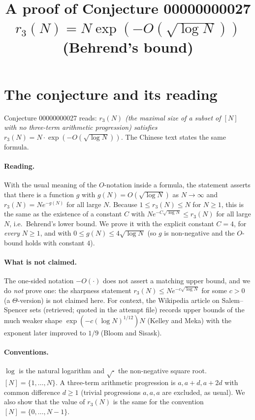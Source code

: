 \documentclass[11pt]{article}
\title{A proof of Conjecture 00000000027\\[2pt]
\large $r_3(N) = N\exp(-O(\sqrt{\log N}))$ (Behrend's bound)}
\date{}
\theoremstyle{definition}
\theoremstyle{remark}
\renewcommand{\_}{\oldus\allowbreak}
\begin{document}
\sloppy
\maketitle

\section{The conjecture and its reading}

Conjecture 00000000027 reads: \emph{$r_3(N)$ (the maximal size of a subset of $[N]$ with no
three-term arithmetic progression) satisfies $r_3(N) = N\cdot\exp(-O(\sqrt{\log N}))$.} The Chinese
text states the same formula.

\paragraph{Reading.} With the usual meaning of the $O$-notation inside a formula, the statement asserts
that there is a function $g$ with $g(N) = O(\sqrt{\log N})$ as $N\to\infty$ and
$r_3(N) = N e^{-g(N)}$ for all large $N$. Because $1 \le r_3(N) \le N$ for $N \ge 1$, this is the same as
the existence of a constant $C$ with $N e^{-C\sqrt{\log N}} \le r_3(N)$ for all large $N$, i.e.\ Behrend's
lower bound. We prove it with the explicit constant $C = 4$, for \emph{every} $N\ge 1$, and with
$0 \le g(N) \le 4\sqrt{\log N}$ (so $g$ is non-negative and the $O$-bound holds with constant $4$).

\paragraph{What is not claimed.} The one-sided notation $-O(\cdot)$ does not assert a matching upper
bound, and we do \emph{not} prove one: the sharpness statement $r_3(N) \le N e^{-c\sqrt{\log N}}$ for some
$c>0$ (a $\Theta$-version) is not claimed here. For context, the Wikipedia article on Salem--Spencer sets
(retrieved; quoted in the attempt file) records upper bounds of the much weaker shape
$\exp(-c(\log N)^{1/12})N$ (Kelley and Meka) with the exponent later improved to $1/9$ (Bloom and Sisask).

\paragraph{Conventions.} $\log$ is the natural logarithm and $\sqrt{\cdot}$ the non-negative square
root. $[N] = \{1,\dots,N\}$. A three-term arithmetic progression is $a, a+d, a+2d$ with common difference
$d \ge 1$ (trivial progressions $a,a,a$ are excluded, as usual). We also show that the value of $r_3(N)$ is
the same for the convention $[N] = \{0,\dots,N-1\}$.
\end{document}
